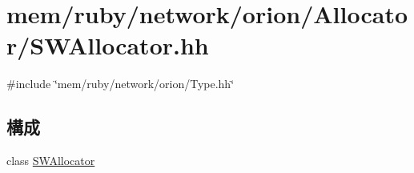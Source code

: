 \hypertarget{SWAllocator_8hh}{
\section{mem/ruby/network/orion/Allocator/SWAllocator.hh}
\label{SWAllocator_8hh}
}
{\ttfamily \#include \char`\"{}mem/ruby/network/orion/Type.hh\char`\"{}}\par
\subsection*{構成}
\begin{DoxyCompactItemize}
\item 
class \hyperlink{classSWAllocator}{SWAllocator}
\end{DoxyCompactItemize}
